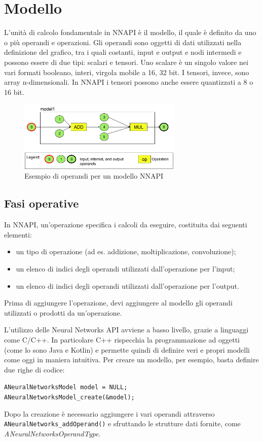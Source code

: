 \section{Modello}
L'unità di calcolo fondamentale in NNAPI è il modello, il quale è definito da uno o più operandi e operazioni.
Gli operandi sono oggetti di dati utilizzati nella definizione del grafico, tra i quali costanti, input e output e nodi intermedi e possono essere di due tipi: scalari e tensori.
Uno scalare è un singolo valore nei vari formati booleano, interi, virgola mobile a 16, 32 bit.
I tensori, invece, sono array n-dimensionali. In NNAPI i tensori possono anche essere quantizzati a 8 o 16 bit.

\begin{figure}[ht]
    \centering
    \includegraphics[width=0.7\textwidth]{Immagini/operandi.png}
    \caption{Esempio di operandi per un modello NNAPI}
    \label{fig:operandi}    
\end{figure}

\subsection{Fasi operative}
In NNAPI, un'operazione specifica i calcoli da eseguire, costituita dai seguenti elementi:
\begin{itemize}
    \item un tipo di operazione (ad es. addizione, moltiplicazione, convoluzione);
    \item un elenco di indici degli operandi utilizzati dall'operazione per l'input;
    \item un elenco di indici degli operandi utilizzati dall'operazione per l'output.
\end{itemize}
Prima di aggiungere l'operazione, devi aggiungere al modello gli operandi utilizzati o prodotti da un'operazione.

L’utilizzo delle Neural Networks API avviene a basso livello, grazie a linguaggi come C/C++. In particolare C++ rispecchia la programmazione ad oggetti (come lo sono Java e Kotlin) e permette quindi di
definire veri e propri modelli come oggi in maniera intuitiva.
Per creare un modello, per esempio, basta definire due righe di codice:
\begin{center}
\texttt{ANeuralNetworksModel\* model = NULL;} \\ \texttt{ANeuralNetworksModel\_create(\&model);}\\
\end{center}
Dopo la creazione è necessario aggiungere i vari operandi attraverso \texttt{ANeuralNetworks\_addOperand()} e sfruttando le strutture dati fornite, come \textit{ANeuralNetworksOperandType}.

